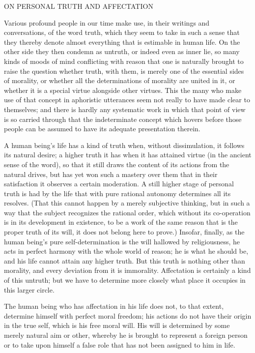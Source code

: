 \documentclass[12pt,a4paper,openany]{book}
\newcommand{\opage}[1]{\marginnote{\footnotesize\textit{[#1]}}}
\newcommand{\excerpthead}[1]{\par\bigskip\begin{center}#1\end{center}\nopagebreak\smallskip}
\begin{document}
\setcounter{footnote}{0}%
\excerpthead{ON PERSONAL TRUTH AND AFFECTATION}\opage{156}

Various profound people in our time make use, in their writings and conversations,
of the word truth, which they seem to take in such a sense that they thereby denote
almost everything that is estimable in human life. On the other side they then
condemn as untruth, or indeed even as inner lie, so many kinds of moods of mind
conflicting with reason that one is naturally brought to raise the question whether
truth, with them, is merely one of the essential sides of morality, or whether all the
determinations of morality are united in it, or whether it is a special virtue
alongside other virtues. This the many who make use of that concept in aphoristic
utterances seem not really to have made clear to themselves; and there is hardly any
systematic work in which that point of view is so carried through that the
indeterminate concept which hovers before those people can be assumed to have its
adequate presentation therein.

A human being's life has a kind of truth when, without dissimulation, it follows its
natural desire; a higher truth it has when it has attained virtue (in the ancient
sense of the word), so that it still draws the content of its actions from the
natural drives, but has yet won such a mastery over them that in their satisfaction
it observes a certain moderation. A still higher stage of personal truth is had by the
life that with pure rational autonomy determines all its resolves. (That this cannot
happen by a merely subjective thinking, but in such a way that the subject recognizes
the rational order, which without its co-operation is in its development in
existence, to be a work of the same reason that is the proper truth of its will, it
does not belong here to prove.) Insofar, finally, as the human being's pure
self-determination is the will hallowed by religiousness, he acts in perfect harmony
with the whole world of reason; he is what he should be, and his life cannot attain
any higher truth. But this truth is nothing other than morality,
\setcounter{footnote}{0}%
\opage{157}and every deviation from it is immorality. Affectation is certainly a kind of this
untruth; but we have to determine more closely what place it occupies in this larger
circle.

The human being who has affectation in his life does not, to that extent, determine
himself with perfect moral freedom; his actions do not have their origin in the true
self, which is his free moral will. His will is determined by some merely natural aim
or other, whereby he is brought to represent a foreign person or to take upon himself
a false role that has not been assigned to him in life.
\end{document}
